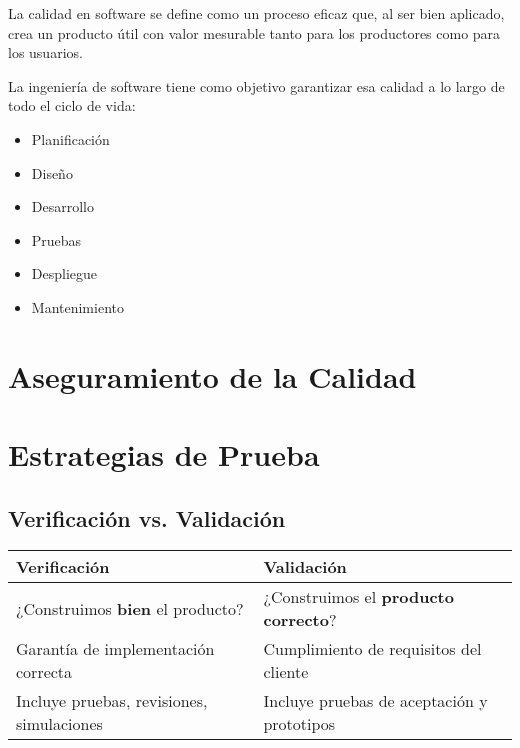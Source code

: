 \minitoc
\begin{definicion}
    La calidad en software se define como un proceso eficaz que, al ser bien aplicado, crea un producto útil con valor mesurable tanto para los productores como para los usuarios.
\end{definicion}

La ingeniería de software tiene como objetivo garantizar esa calidad a lo largo de todo el ciclo de vida:

\begin{itemize}
    \item Planificación
    \item Diseño
    \item Desarrollo
    \item Pruebas
    \item Despliegue
    \item Mantenimiento
\end{itemize}


\section{Aseguramiento de la Calidad}\label{sec:aseguramiento-de-la-calidad}


\section{Estrategias de Prueba}\label{sec:estrategias-de-prueba}

\subsection{Verificación vs. Validación}\label{subsec:verificacion-vs.-validacion}

\begin{center}
    \begin{tabular}{|l|l|}
        \hline
        \textbf{Verificación}                     & \textbf{Validación}                         \\
        \hline
        ¿Construimos \textbf{bien} el producto?   & ¿Construimos el \textbf{producto correcto}? \\
        Garantía de implementación correcta       & Cumplimiento de requisitos del cliente      \\
        Incluye pruebas, revisiones, simulaciones & Incluye pruebas de aceptación y prototipos  \\
        \hline
    \end{tabular}
\end{center}


